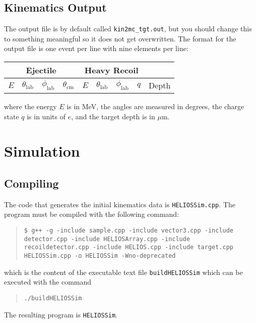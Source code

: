 \subsection{Kinematics Output}
The output file is by default called \texttt{kin2mc\_tgt.out}, but you should change this to something meaningful so it does not get overwritten. 
The format for the output file is one event per line with nine elements per line: 

\begin{center}
\begin{tabular}{|c|c|c|c||c|c|c|c||c|}
\hline
\multicolumn{4}{|c||}{Ejectile}&\multicolumn{4}{c||}{Heavy Recoil}&\\\hline
$E$&$\theta_\mathrm{lab}$&$\phi_\mathrm{lab}$&$\theta_\mathrm{cm}$&$E$&$\theta_\mathrm{lab}$&$\phi_\mathrm{lab}$&$q$&Depth\\\hline
\end{tabular}
\end{center}
where the energy $E$ is in MeV, the angles are measured in degrees, the charge state $q$ is in units of $e$, and the target depth is in $\mu$m.

\section{Simulation}
\subsection{Compiling}
The code that generates the initial kinematics data is \texttt{HELIOSSim.cpp}.  The program must be compiled with the following command: 
\begin{quote}
\texttt{{\color{green}\$} g++ -g -include sample.cpp -include vector3.cpp -include detector.cpp -include HELIOSArray.cpp -include recoildetector.cpp -include HELIOS.cpp -include target.cpp HELIOSSim.cpp -o HELIOSSim -Wno-deprecated}
\end{quote} which is the content of the executable text file \texttt{buildHELIOSSim} which can be executed with the command
\begin{quote}
\begin{Verbatim}
./buildHELIOSSim
\end{Verbatim}
\end{quote}
The resulting program is \texttt{HELIOSSim}.

